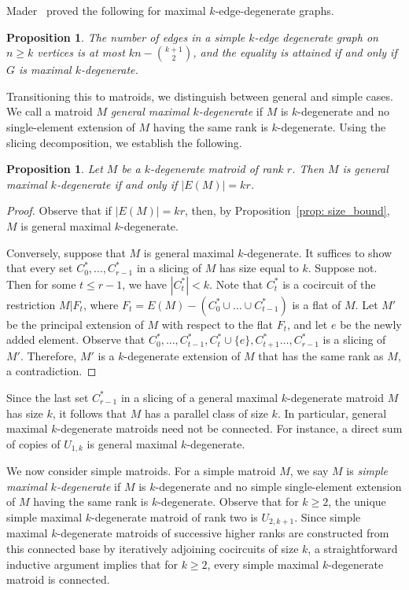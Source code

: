 \documentclass{amsart}
\newtheorem{proposition}[theorem]{Proposition}
\theoremstyle{definition}
\theoremstyle{remark}
\numberwithin{equation}{section}
\begin{document}
Mader~\cite{mader_71} proved the following for maximal $k$-edge-degenerate graphs. 

\begin{proposition}
\label{prop: mader_maximal_k_degen}
The number of edges in a simple $k$-edge degenerate graph on $n \geq k$ vertices is at most $kn - \binom{k+1}{2}$, and the equality is attained if and only if $G$ is maximal $k$-degenerate.
\end{proposition}

Transitioning this to matroids, we distinguish between general and simple cases. We call a matroid $M$ \textit{general maximal $k$-degenerate} if $M$ is $k$-degenerate and no single-element extension of $M$ having the same rank is $k$-degenerate. Using the slicing decomposition, we establish the following.

\begin{proposition}
\label{prop: maximal_non_simple}
Let $M$ be a $k$-degenerate matroid of rank $r$. Then $M$ is general maximal $k$-degenerate if and only if $|E(M)| = kr$. 
\end{proposition}

\begin{proof}
Observe that if $|E(M)| = kr$, then, by Proposition~\ref{prop: size_bound}, $M$ is general maximal $k$-degenerate. 

Conversely, suppose that $M$ is general maximal $k$-degenerate. It suffices to show that every set $C^*_{0}, \ldots, C^*_{r-1}$ in a slicing of $M$ has size equal to $k$. Suppose not. Then for some $t \leq r-1$, we have $|C^*_t| < k$. Note that $C^*_t$ is a cocircuit of the restriction $M|F_t$, where $F_t = E(M) - (C^*_0 \cup \ldots \cup C^*_{t-1})$ is a flat of $M$. Let $M'$ be the principal extension of $M$ with respect to the flat $F_t$, and let $e$ be the newly added element. Observe that $C^*_0, \ldots, C^*_{t-1}, C^*_t \cup \{e\}, C^*_{t+1} \ldots, C^*_{r-1}$ is a slicing of $M'$. Therefore, $M'$ is a $k$-degenerate extension of $M$ that has the same rank as $M$, a contradiction.
\end{proof}

Since the last set $C^*_{r-1}$ in a slicing of a general maximal $k$-degenerate matroid $M$ has size $k$, it follows that $M$ has a parallel class of size $k$. In particular, general maximal $k$-degenerate matroids need not be connected. For instance, a direct sum of copies of $U_{1,k}$ is general maximal $k$-degenerate. 

We now consider simple matroids. For a simple matroid $M$, we say $M$ is \textit{simple maximal $k$-degenerate} if $M$ is $k$-degenerate and no simple single-element extension of $M$ having the same rank is $k$-degenerate. Observe that for $k\geq 2$, the unique simple maximal $k$-degenerate matroid of rank two is $U_{2,k+1}$. Since simple maximal $k$-degenerate matroids of successive higher ranks are constructed from this connected base by iteratively adjoining cocircuits of size $k$, a straightforward inductive argument implies that for $k \geq 2$, every simple maximal $k$-degenerate matroid is connected. 
\end{document}

